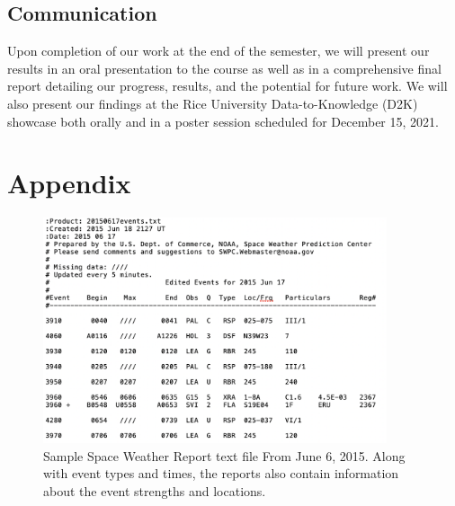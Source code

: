 \documentclass[12pt, letterpaper]{article}
\begin{document}
\subsection*{Communication}
Upon completion of our work at the end of the semester, we will present our results in an oral presentation to the course as well as in a comprehensive final report detailing our progress, results, and the potential for future work. We will also present our findings at the Rice University Data-to-Knowledge (D2K) showcase both orally and in a poster session scheduled for December 15, 2021. 






\pagebreak
\section*{Appendix}


\begin{figure}[ht]
    \includegraphics[width=0.9\textwidth]{figures/swr_sample.png}
    \centering
    \caption{Sample Space Weather Report text file From June 6, 2015. Along with event types and times, the reports also contain information about the event strengths and locations.}
    \label{swr_sample}
\end{figure}
\end{document}

